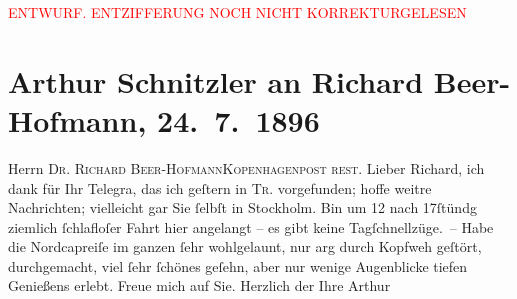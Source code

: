 
\begin{center}
            \textcolor{red}{ENTWURF. ENTZIFFERUNG NOCH NICHT KORREKTURGELESEN}
                      \end{center}
            
               \section[Arthur Schnitzler an Richard Beer-Hofmann, 24. 7. 1896]{ Arthur Schnitzler an Richard Beer-Hofmann,
               24. 7. 1896}\nopagebreak{}\rehead{ }\begin{ledgroupsized}[t]{13cm}\normalsize\beginnumbering{} \toendnotes[C]{\smallbreak\pagebreak[2]} 
\pstart{}{\pb}Herrn \textsc{Dr. Richard
                     Beer-Hofmann}\pend{}\pstart{}\textsc{Kopenhagen}\pend{}\pstart{}\textsc{post rest.}\pend{}{\bigskip}\pstart
           \noindent{}{\pb}Lieber Richard, ich dank für Ihr Telegra{\geminationm}, das ich geſtern in \textsc{Tr}. vorgefunden; hoffe weitre Nachrichten; vielleicht gar Sie ſelbſt in
                  Stockholm. Bin um 12 nach 17ſtündg
               ziemlich ſchlafloſer Fahrt hier angelangt – es gibt keine {\pb}Tagſchnellzüge. – Habe die Nordcapreiſe im ganzen ſehr wohlgelaunt, nur arg durch Kopfweh
               geſtört, durchgemacht, viel ſehr ſchönes geſehn, aber nur wenige Augenblicke tiefen
               Genießens erlebt. Freue mich auf Sie. Herzlich der Ihre \spacefill\mbox{Arthur}\pend
           \endnumbering{}\end{ledgroupsized}  \newcommand{\dateiname}{L00567}\newcommand{\titel}{Arthur Schnitzler an Richard Beer-Hofmann, 24. 7. 1896}\newcommand{\editorInnen}{Martin Anton Müller und Gerd-Hermann Susen}
      